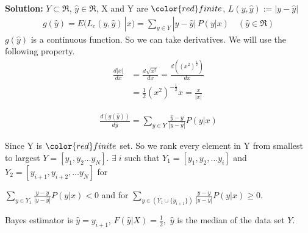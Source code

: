 \documentclass[A4,12pt]{article}
\begin{document}
\begin{enumerate}[6.]
\begin{enumerate}[(b)]
       \textbf{Solution:}
       $Y\subset\Re$, $\hat{y} \in \Re$, X and Y are $\color{red}finite$, $L(y,\hat{y}):=|y-\hat{y}|$
       \begin{equation}
       \begin{aligned}
       g(\hat{y})=E(L_c(y,\hat{y})\, |x)=\sum_{y\in Y}|y-\hat{y}|\, P(y|x) \quad(\hat{y}\in \Re)
       \end{aligned}
       \end{equation}
       $g(\hat{y})$ is a continuous function. So we can take derivatives. We will use the following property.
        \begin{equation}
       \begin{aligned}
       \frac{d|x|}{dx}&=\frac{d\sqrt{x^2}}{dx}=\frac{d((x^2)^\frac{1}{2})}{dx}\\
       &=\frac{1}{2} (x^2)^{-\frac{1}{2}}x=\frac{x}{|x|}
       \end{aligned}
       \end{equation}

       \begin{equation}
       \begin{aligned}
       \frac{d(g(\hat{y}))}{d\hat{y}} =\sum_{y\in Y} \frac{\hat{y}-y}{|y-\hat{y}|}P(y|x)
       \end{aligned}
       \end{equation}

       Since Y is $\color{red}finite$ set. So we rank every element in Y from smallest to largest
       $Y=[y_1,y_2 \ldots y_N]$. $\exists\; i$ such that  $Y_1 = [y_1,y_2,\ldots y_i]$ and $Y_2 = [y_{i+1},y_{i+2},\ldots y_N]$ for

       $\sum_{y\in Y_1} \frac{\hat{y}-y}{|y-\hat{y}|}P(y|x)<0$ and for
       $\sum_{y\in (Y_1\cup \{y_{i+1}\})} \frac{\hat{y}-y}{|y- \hat{y}|} P(y|x) \geqslant 0$.

       Bayes estimator is $\hat{y}=y_{i+1}$, $F(\hat{y}|X)=\frac{1}{2}$,\, $\hat{y}$ is the median of the data set $Y$.\\


\end{enumerate}
\end{enumerate}
\end{document}
